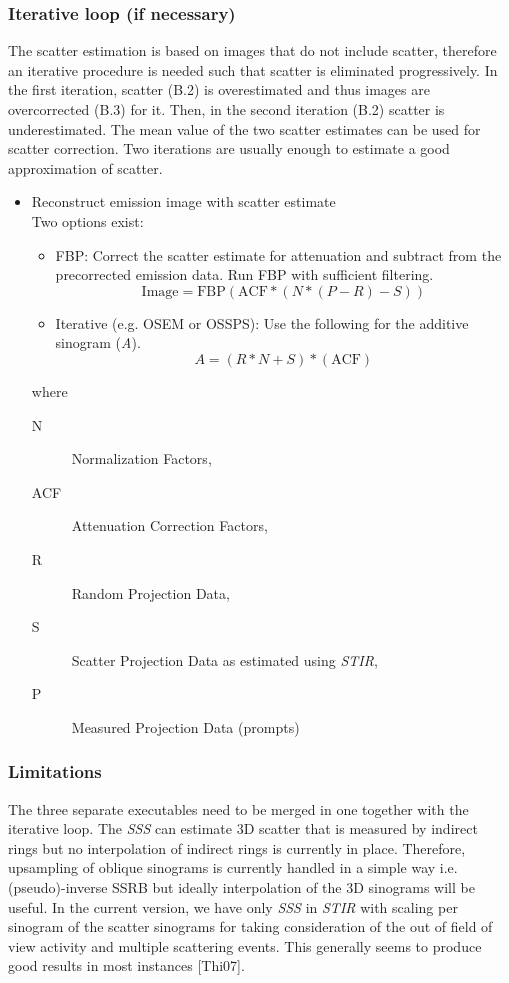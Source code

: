 \documentclass{article}
\begin{document}
\subsubsection{Iterative loop (if necessary)}
The scatter estimation is based on images that do not include scatter, therefore an iterative procedure
is needed such that scatter is eliminated progressively. In the first iteration, scatter (B.2) is
overestimated and thus images are overcorrected (B.3) for it. Then, in the second iteration (B.2) scatter
is underestimated. The mean value of the two scatter estimates can be used for scatter correction. Two
iterations are usually enough to estimate a good approximation of scatter.

\begin{itemize}
\item Reconstruct emission image with scatter estimate\\
Two options exist:
\begin{itemize}
\item	FBP: Correct the scatter estimate for attenuation and subtract from the precorrected emission data. 
Run FBP with sufficient filtering.
   \[\mathrm{Image} = \mathrm{FBP}\left(\mathrm{ACF}*(N*(P-R)-S)\right) \]
\item Iterative (e.g. OSEM or OSSPS): Use the following for the additive sinogram (\textit{A}).
    \[A=(R*N+S)*(\mathrm{ACF})  \]
\end{itemize}
where
  \begin{description}
   \item[N] Normalization Factors, 
   \item[ACF] Attenuation Correction Factors,
   \item[R] Random Projection Data,
   \item[S] Scatter Projection Data as estimated using  \textit{STIR},
   \item[P] Measured Projection Data (prompts)
  \end{description}
\end{itemize}

\subsubsection{Limitations}
The three separate executables need to be merged in one together with the iterative loop. The
\textit{SSS} can estimate 3D scatter that is measured by indirect rings but no interpolation of indirect
rings is currently in place. Therefore, upsampling of oblique sinograms is currently handled in a simple
way i.e. (pseudo)-inverse SSRB but ideally interpolation of the 3D sinograms will be useful. In the
current version, we have only \textit{SSS} in \textit{STIR} with scaling per sinogram of the scatter
sinograms for taking consideration of the out of field of view activity and multiple scattering
events. This generally seems to produce good results in most instances [Thi07].
\end{document}
